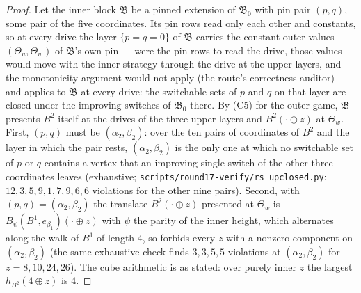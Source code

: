 \documentclass[11pt]{article}
\theoremstyle{plain}
\theoremstyle{definition}
\begin{document}
\begin{proof}
Let the inner block $\mathfrak B$ be a pinned extension of $\mathfrak B_0$
with pin pair $(p,q)$, some pair of the five coordinates. Its pin rows
read only each other and constants, so at every drive the layer
$\{p=q=0\}$ of $\mathfrak B$ carries the constant outer values
$(\Theta_u,\Theta_w)$ of $\mathfrak B$'s own pin --- were the pin rows to
read the drive, those values would move with the inner strategy through
the drive at the upper layers, and the monotonicity argument would not
apply (the route's correctness auditor) --- and 
applies to $\mathfrak B$ at every drive: the
switchable sets of $p$ and $q$ on that layer are closed under the improving
switches of $\mathfrak B_0$ there. By (C5) for the
outer game, $\mathfrak B$ presents $B^{2}$ itself at the drives of the three
upper layers and $B^{2}(\cdot\oplus z)$ at $\Theta_w$. First, $(p,q)$ must
be $(\alpha_2,\beta_2)$: over the ten pairs of coordinates of $B^{2}$ and
the layer in which the pair rests, $(\alpha_2,\beta_2)$ is the only one at
which no switchable set of $p$ or $q$ contains a vertex that an improving
single switch of the other three coordinates leaves (exhaustive;
\texttt{scripts/round17-verify/rs\_upclosed.py}: $12,3,5,9,1,7,9,6,6$
violations for the other nine pairs). Second, with $(p,q)=(\alpha_2,\beta_2)$
the translate $B^{2}(\cdot\oplus z)$ presented at $\Theta_w$ is
$B_\psi(B^{1},e_{\beta_1})(\cdot\oplus z)$ with $\psi$ the parity of the
inner height, which alternates along the walk of $B^{1}$ of length $4$, so
 forbids every $z$ with a nonzero component
on $(\alpha_2,\beta_2)$ (the same exhaustive check finds $3,3,5,5$
violations at $(\alpha_2,\beta_2)$ for $z=8,10,24,26$). The cube arithmetic
is as stated: over purely inner $z$ the largest $h_{B^{2}}(4\oplus z)$ is $4$.
\end{proof}
\end{document}
